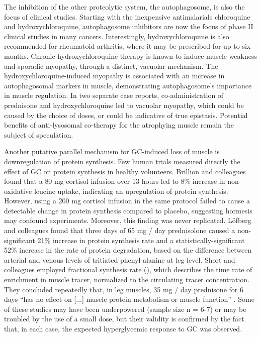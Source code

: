 \documentclass[12pt,english]{report}\usepackage[]{graphicx}\usepackage[]{color}
\begin{document}
The inhibition of the other proteolytic system, the autophagosome,
is also the focus of clinical studies. Starting with the inexpensive
antimalarials chloroquine and hydroxychloroquine, autophagosome inhibitors
are now the focus of phase II clinical studies in many cancers\citep{amaravadi2011principles}.
Interestingly, hydroxychloroquine is also recommended for rheumatoid
arthritis, where it may be prescribed for up to six months\citep{sanofiaventisusllc2006plaquenil}.
Chronic hydroxychloroquine therapy is known to induce muscle weakness
and sporadic myopathy, through a distinct, vacuolar mechanism. The
hydroxychloroquine-induced myopathy is associated with an increase
in autophagosomal markers in muscle, demonstrating autophagosome's
importance in muscle regulation\citep{lee2012clinical}. In two separate
case reports, co-administration of prednisone and hydroxychloroquine
led to vacuolar myopathy, which could be caused by the choice of doses,
or could be indicative of true epistasis\citep{ghosh2013teaching,nucci1996chloroquine}.
Potential benefits of anti-lysosomal co-therapy for the atrophying
muscle remain the subject of speculation.

Another putative parallel mechanism for GC-induced loss of muscle
is downregulation of protein synthesis. Few human trials measured
directly the effect of GC on protein synthesis in healthy volunteers.
Brillion and colleagues\citep{brillon1995effect} found that a 80
mg cortisol infusion over 13 hours led to 8\% increase in non-oxidative
leucine uptake, indicating an upregulation of protein synthesis. However,
using a 200 mg cortisol infusion in the same protocol failed to cause
a detectable change in protein synthesis compared to placebo, suggesting
hormesis may confound experiments. Moreover, this finding was never
replicated. Löfberg and colleagues\citep{lofberg2002effects} found
that three days of 65 mg / day prednisolone caused a non-significant
21\% increase in protein synthesis rate and a statistically-significant
52\% increase in the rate of protein degradation, based on the difference
between arterial and venous levels of tritiated phenyl alanine at
leg level. Short and colleagues employed fractional synthesis rate
(), which describes
the time rate of enrichment in muscle tracer, normalized to the circulating
tracer concentration. They concluded repeatedly that, in leg muscles,
35 mg / day prednisone for 6 days ``has no effect on {[}...{]} muscle
protein metabolism or muscle function''\citep{short2004effect,short2009short-term}
. Some of these studies may have been underpowered (sample size n
= 6-7) or may be troubled by the use of a small dose, but their validity
is confirmed by the fact that, in each case, the expected hyperglycemic
response to GC was observed. 
\end{document}
